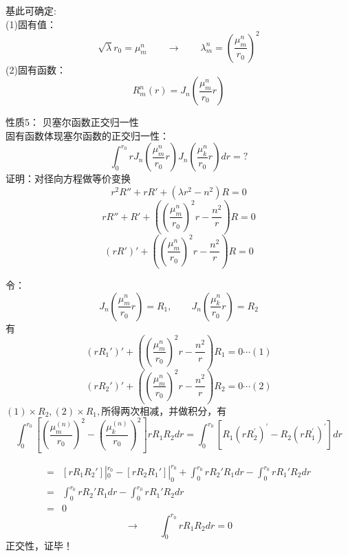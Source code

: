 \begin{frame}
	基此可确定:\\	
	(1)固有值：
	\[ \sqrt{\lambda}r_0 = \mu_{m}^{n}  \qquad \to \qquad \lambda_m ^n =(\frac{\mu_{m}^{n}}{r_0})^2 \]
	(2)固有函数：\[R_m ^n(r) = J_n (\frac{\mu_{m}^{n}}{r_0}r) \]
\end{frame}

\begin{frame}
	\alert{性质5：} 贝塞尔函数正交归一性\\
	固有函数体现塞尔函数的正交归一性：
	\begin{equation*}
		\int_0 ^{r_0} r J_n (\frac{\mu_{m} ^{n}}{r_0}r) J_n (\frac{\mu_{k} ^{n}}{r_0}r) dr =?
	\end{equation*}
	\alert{证明：}对径向方程做等价变换
	\begin{equation*}
		r^2 R''+r R' +(\lambda r^2 -n^2)R=0 
	\end{equation*}	
	\begin{equation*}
		r R''+ R' +((\frac{\mu_{m}^{n}}{r_0})^2 r -\frac{n^2}{r})R=0  
	\end{equation*}	
	\begin{equation*}
		(r R')' +((\frac{\mu_{m}^{n}}{r_0})^2 r -\frac{n^2}{r})R=0  
	\end{equation*}	
\end{frame}	

\begin{frame}
	令：\[J_n (\frac{\mu_{m}^{n}}{r_0}r)=R_1, \qquad J_n (\frac{\mu_{k}^{n}}{r_0}r) =R_2\]
	有
	\begin{equation*}
		(r R_1')' +((\frac{\mu_{m}^{n}}{r_0})^2 r -\frac{n^2}{r})R_1=0  \cdots (1)
	\end{equation*}	 
	\begin{equation*}
		(r R_2')' +((\frac{\mu_{m}^{n}}{r_0})^2 r -\frac{n^2}{r})R_2=0  \cdots (2) 
	\end{equation*}	
	$(1)\times R_2,  (2)\times R_1,$所得两次相减，并做积分，有
	\begin{equation*}	
		\int_0 ^{r_0} \left[\left(\frac{\mu_{m}^{(n)}}{r_0}\right)^{2}-\left(\frac{\mu_{k}^{(n)}}{r_0}\right)^{2}\right] r R_{1} R_{2} dr 
		=\int_0 ^{r_0}  [R_{1}\left(r R_{2}^{\prime}\right)^{\prime}-R_{2}\left(r R_{1}^{\prime}\right)^{\prime}] dr
	\end{equation*}
\end{frame}	

\begin{frame}
	\begin{equation*}
		\begin{split}
			=& [r R_1 R_2']|_0 ^{r_0} - [r R_2 R_1']|_0 ^{r_0} + \int_0 ^{r_0} r R_2' R_1 dr - \int_0 ^{r_0} rR_1' R_2 dr\\
			=& \int_0 ^{r_0} rR_2'R_1 dr - \int_0 ^{r_0} rR_1'R_2 dr\\
			=& 0
		\end{split}
	\end{equation*}	
	\begin{equation*}	
		\to \qquad	\int_0 ^{r_0} r R_{1} R_{2} dr = 0
	\end{equation*}
	正交性，\alert{证毕！}
\end{frame}	

